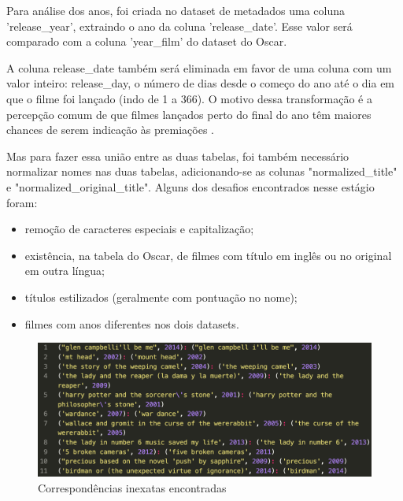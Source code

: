         Para análise dos anos, foi criada no dataset de metadados uma coluna 'release\_year', extraindo o ano da coluna 'release\_date'. Esse valor será comparado com a coluna 'year\_film' do dataset do Oscar.
        
        A coluna release\_date também será eliminada em favor de uma coluna com um valor inteiro: release\_day, o número de dias desde o começo do ano até o dia em que o filme foi lançado (indo de 1 a 366). O motivo dessa transformação é a percepção comum de que filmes lançados perto do final do ano têm maiores chances de serem indicação às premiações \cite{hdsr2020}. 

        Mas para fazer essa união entre as duas tabelas, foi também necessário normalizar nomes nas duas tabelas, adicionando-se as colunas "normalized\_title" e "normalized\_original\_title". Alguns dos desafios encontrados nesse estágio foram:

        \begin{itemize}
            \item remoção de caracteres especiais e capitalização;
            \item existência, na tabela do Oscar, de filmes com título em inglês ou no original em outra língua;
            \item títulos estilizados (geralmente com pontuação no nome);
            \item filmes com anos diferentes nos dois datasets.
        \end{itemize}

        \begin{figure}[htb]
        	\caption{\label{corresp}Correspondências inexatas encontradas}
        	\begin{center}
        		\includegraphics[scale=0.35]{corresp.png}
        	\end{center}
        \end{figure}
        

